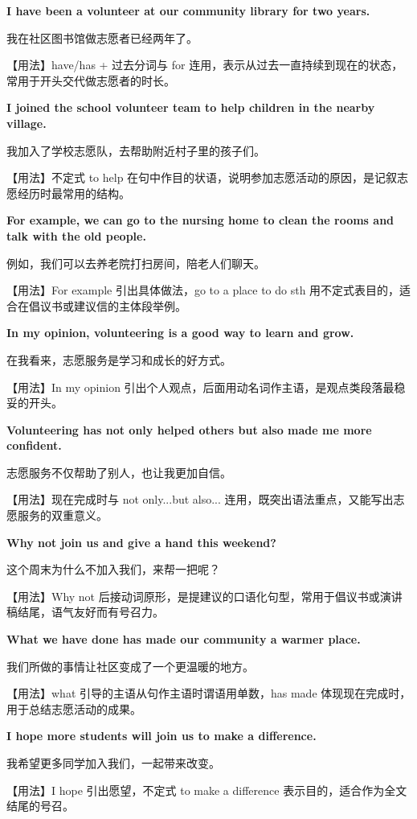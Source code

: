 \documentclass[UTF8,a4paper,11pt,oneside]{ctexbook}
\newcommand{\fansection}[1]{%
  \par\addvspace{2.4ex}%
  \Needspace{6\baselineskip}%
  \noindent{\sffamily\Large\bfseries\color{mainblue}#1}\par
  \nopagebreak
  \addvspace{0.2ex}%
  \noindent{\color{rulelight}\rule{\linewidth}{0.9pt}}\par
  \addvspace{0.9ex}%
  \nobreak
}
\newcommand{\fanpat}[3]{%
  \item{\bfseries #1}\par\nopagebreak
  {\small\color{textgray}#2}\par\nopagebreak
  {\footnotesize\color{accent!90!black}【用法】#3}\par
}
\begin{document}
\fansection{〇、本单元写作常用句型}
\begin{fanpatterns}
\fanpat{I have been a volunteer at our community library for two years.}{我在社区图书馆做志愿者已经两年了。}{have/has + 过去分词与 for 连用，表示从过去一直持续到现在的状态，常用于开头交代做志愿者的时长。}

\fanpat{I joined the school volunteer team to help children in the nearby village.}{我加入了学校志愿队，去帮助附近村子里的孩子们。}{不定式 to help 在句中作目的状语，说明参加志愿活动的原因，是记叙志愿经历时最常用的结构。}

\fanpat{For example, we can go to the nursing home to clean the rooms and talk with the old people.}{例如，我们可以去养老院打扫房间，陪老人们聊天。}{For example 引出具体做法，go to a place to do sth 用不定式表目的，适合在倡议书或建议信的主体段举例。}

\fanpat{In my opinion, volunteering is a good way to learn and grow.}{在我看来，志愿服务是学习和成长的好方式。}{In my opinion 引出个人观点，后面用动名词作主语，是观点类段落最稳妥的开头。}

\fanpat{Volunteering has not only helped others but also made me more confident.}{志愿服务不仅帮助了别人，也让我更加自信。}{现在完成时与 not only...but also... 连用，既突出语法重点，又能写出志愿服务的双重意义。}

\fanpat{Why not join us and give a hand this weekend?}{这个周末为什么不加入我们，来帮一把呢？}{Why not 后接动词原形，是提建议的口语化句型，常用于倡议书或演讲稿结尾，语气友好而有号召力。}

\fanpat{What we have done has made our community a warmer place.}{我们所做的事情让社区变成了一个更温暖的地方。}{what 引导的主语从句作主语时谓语用单数，has made 体现现在完成时，用于总结志愿活动的成果。}

\fanpat{I hope more students will join us to make a difference.}{我希望更多同学加入我们，一起带来改变。}{I hope 引出愿望，不定式 to make a difference 表示目的，适合作为全文结尾的号召。}

\end{fanpatterns}

\fansection{一、满分范文}
\end{document}
